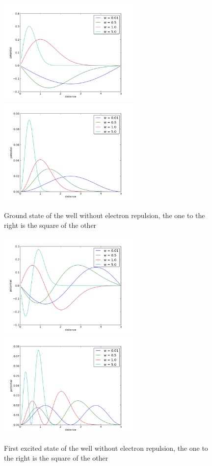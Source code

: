 \documentclass[a4wide,12pt]{article}
\begin{document}
\begin{figure}[p]
	\includegraphics[width=70mm]{potential}
	\includegraphics[width=70mm]{potentialsquare}
		\caption{Ground state of the well without electron repulsion, the one to the right is the square of the other}
\end{figure}	 
\begin{figure}[p]
	\includegraphics[width=70mm]{potentialexc1}
	\includegraphics[width=70mm]{potentialexc1square}
		\caption{First excited state of the well without electron repulsion, the one to the right is the square of the other}
\end{figure}	
\end{document}

